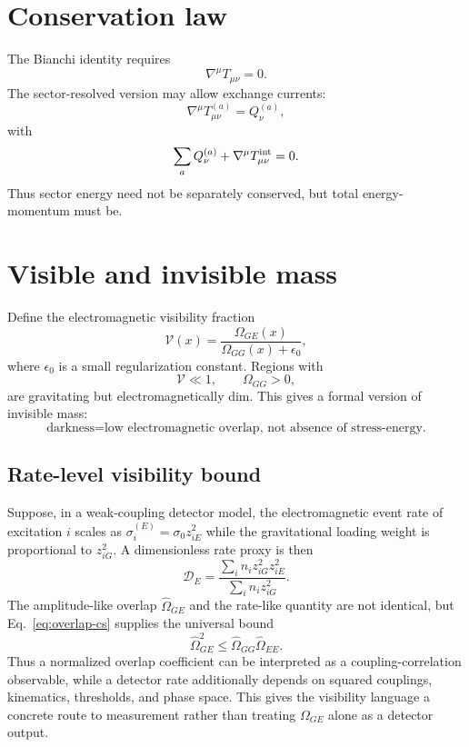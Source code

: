 \documentclass[11pt]{article}
\theoremstyle{remark}
\begin{document}
\section{Conservation law}
The Bianchi identity requires
\begin{equation}
    \nabla^\mu T_{\mu\nu}=0.
\end{equation}
The sector-resolved version may allow exchange currents:
\begin{equation}
    \nabla^\mu T^{(a)}_{\mu\nu}=Q^{(a)}_\nu,
\end{equation}
with
\begin{equation}
    \sum_a Q^{(a)}_\nu+\nabla^\mu T^{\rm int}_{\mu\nu}=0.
\end{equation}
Thus sector energy need not be separately conserved, but total energy-momentum must be.

\section{Visible and invisible mass}
Define the electromagnetic visibility fraction
\begin{equation}
    \mathcal V(x)=\frac{\Omega_{GE}(x)}{\Omega_{GG}(x)+\epsilon_0},
\end{equation}
where $\epsilon_0$ is a small regularization constant. Regions with
\begin{equation}
    \mathcal V\ll 1,
    \qquad
    \Omega_{GG}>0,
\end{equation}
are gravitating but electromagnetically dim. This gives a formal version of invisible mass:
\begin{equation}
    \text{darkness} = \text{low electromagnetic overlap, not absence of stress-energy.}
\end{equation}


\subsection{Rate-level visibility bound}
Suppose, in a weak-coupling detector model, the electromagnetic event rate of excitation $i$ scales as $\sigma_i^{(E)}=\sigma_0 z_{iE}^2$ while the gravitational loading weight is proportional to $z_{iG}^2$. A dimensionless rate proxy is then
\begin{equation}
 \mathcal D_E
 =\frac{\sum_i n_i z_{iG}^2z_{iE}^2}
 {\sum_i n_i z_{iG}^2}.
 \label{eq:rate-visibility}
\end{equation}
The amplitude-like overlap $\widehat\Omega_{GE}$ and the rate-like quantity are not identical, but Eq.~\eqref{eq:overlap-cs} supplies the universal bound
\begin{equation}
 \widehat\Omega_{GE}^2
 \le\widehat\Omega_{GG}\widehat\Omega_{EE}.
\end{equation}
Thus a normalized overlap coefficient can be interpreted as a coupling-correlation observable, while a detector rate additionally depends on squared couplings, kinematics, thresholds, and phase space. This gives the visibility language a concrete route to measurement rather than treating $\Omega_{GE}$ alone as a detector output.
\end{document}
